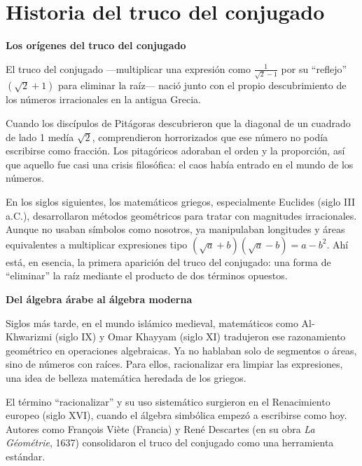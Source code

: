 
\vspace{1cm}

\vspace{1em}
\section*{Historia del truco del conjugado}

\begin{reseñaplana}
\textbf{Los orígenes del truco del conjugado}

El truco del conjugado —multiplicar una expresión como $\frac{1}{\sqrt{2}-1}$ por su “reflejo” $(\sqrt{2}+1)$ 
para eliminar la raíz— nació junto con el propio descubrimiento de los números irracionales en la antigua Grecia.

Cuando los discípulos de Pitágoras descubrieron que la diagonal de un cuadrado de lado 1 medía $\sqrt{2}$, 
comprendieron horrorizados que ese número no podía escribirse como fracción. Los pitagóricos adoraban el orden 
y la proporción, así que aquello fue casi una crisis filosófica: el caos había entrado en el mundo de los números.

En los siglos siguientes, los matemáticos griegos, especialmente Euclides (siglo III a.C.), desarrollaron métodos 
geométricos para tratar con magnitudes irracionales. Aunque no usaban símbolos como nosotros, ya manipulaban 
longitudes y áreas equivalentes a multiplicar expresiones tipo $(\sqrt{a}+b)(\sqrt{a}-b)=a-b^{2}$. Ahí está, en esencia, 
la primera aparición del truco del conjugado: una forma de “eliminar” la raíz mediante el producto de dos términos opuestos.

\textbf{Del álgebra árabe al álgebra moderna}

Siglos más tarde, en el mundo islámico medieval, matemáticos como Al-Khwarizmi (siglo IX) y Omar Khayyam (siglo XI) 
tradujeron ese razonamiento geométrico en operaciones algebraicas. Ya no hablaban solo de segmentos o áreas, sino de números 
con raíces. Para ellos, racionalizar era limpiar las expresiones, una idea de belleza matemática heredada de los griegos.

El término “racionalizar” y su uso sistemático surgieron en el Renacimiento europeo (siglo XVI), cuando el álgebra simbólica 
empezó a escribirse como hoy. Autores como François Viète (Francia) y René Descartes (en su obra \textit{La Géométrie}, 1637) 
consolidaron el truco del conjugado como una herramienta estándar.
\end{reseñaplana}

